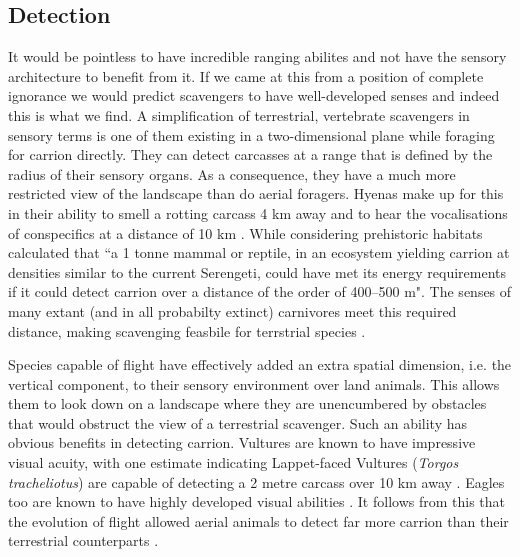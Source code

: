 \documentclass[a4paper,12pt]{article}
\begin{document}
\subsection*{Detection}
It would be pointless to have incredible ranging abilites and not have the sensory architecture to benefit from it.
If we came at this from a position of complete ignorance we would predict scavengers to have well-developed senses and indeed this is what we find. 
A simplification of terrestrial, vertebrate scavengers in sensory terms is one of them existing in a two-dimensional plane while foraging for carrion directly.
They can detect carcasses at a range that is defined by the radius of their sensory organs. %
As a consequence, they have a much more restricted view of the landscape than do aerial foragers.
Hyenas make up for this in their ability to smell a rotting carcass 4 km away and to hear the vocalisations of conspecifics at a distance of 10 km \citep{mills1989comparative}. 
While considering prehistoric habitats \cite{ruxton2004obligate} calculated that ``a 1 tonne mammal or reptile, in an ecosystem yielding carrion at densities similar to the current Serengeti, could have met its energy requirements if it could detect carrion over a distance of the order of 400–500 m".
The senses of many extant (and in all probabilty extinct) carnivores meet this required distance, making scavenging feasbile for terrstrial species \citep{farlow1994speculations,mech2010wolves}. 

Species capable of flight have effectively added an extra spatial dimension, i.e. the vertical component, to their sensory environment over land animals.
This allows them to look down on a landscape where they are unencumbered by obstacles that would obstruct the view of a terrestrial scavenger.
Such an ability has obvious benefits in detecting carrion.
Vultures are known to have impressive visual acuity, with one estimate indicating Lappet-faced Vultures (\textit{Torgos tracheliotus}) are capable of detecting a 2 metre carcass over 10 km away \citep{spiegel2013factors}.
Eagles too are known to have highly developed visual abilities \citep{reymond1985spatial}.
It follows from this that the evolution of flight allowed aerial animals to detect far more carrion than their terrestrial counterparts \citep{AR:AR22815}.
\end{document}
